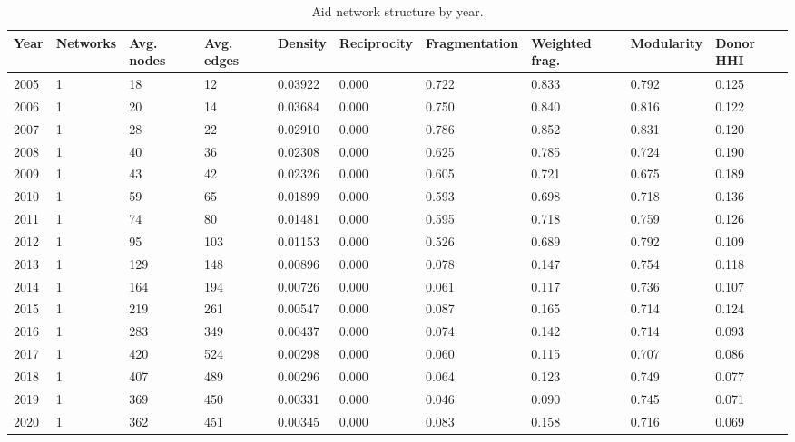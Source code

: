 \begin{table}[!ht]
\centering
\caption{Aid network structure by year.}
\label{tab:aid_network_summary_by_year}
\begin{tabular}{llllllllll}
\toprule
Year & Networks & Avg. nodes & Avg. edges & Density & Reciprocity & Fragmentation & Weighted frag. & Modularity & Donor HHI\\
\midrule
2005 & 1 & 18 & 12 & 0.03922 & 0.000 & 0.722 & 0.833 & 0.792 & 0.125\\
2006 & 1 & 20 & 14 & 0.03684 & 0.000 & 0.750 & 0.840 & 0.816 & 0.122\\
2007 & 1 & 28 & 22 & 0.02910 & 0.000 & 0.786 & 0.852 & 0.831 & 0.120\\
2008 & 1 & 40 & 36 & 0.02308 & 0.000 & 0.625 & 0.785 & 0.724 & 0.190\\
2009 & 1 & 43 & 42 & 0.02326 & 0.000 & 0.605 & 0.721 & 0.675 & 0.189\\
2010 & 1 & 59 & 65 & 0.01899 & 0.000 & 0.593 & 0.698 & 0.718 & 0.136\\
2011 & 1 & 74 & 80 & 0.01481 & 0.000 & 0.595 & 0.718 & 0.759 & 0.126\\
2012 & 1 & 95 & 103 & 0.01153 & 0.000 & 0.526 & 0.689 & 0.792 & 0.109\\
2013 & 1 & 129 & 148 & 0.00896 & 0.000 & 0.078 & 0.147 & 0.754 & 0.118\\
2014 & 1 & 164 & 194 & 0.00726 & 0.000 & 0.061 & 0.117 & 0.736 & 0.107\\
2015 & 1 & 219 & 261 & 0.00547 & 0.000 & 0.087 & 0.165 & 0.714 & 0.124\\
2016 & 1 & 283 & 349 & 0.00437 & 0.000 & 0.074 & 0.142 & 0.714 & 0.093\\
2017 & 1 & 420 & 524 & 0.00298 & 0.000 & 0.060 & 0.115 & 0.707 & 0.086\\
2018 & 1 & 407 & 489 & 0.00296 & 0.000 & 0.064 & 0.123 & 0.749 & 0.077\\
2019 & 1 & 369 & 450 & 0.00331 & 0.000 & 0.046 & 0.090 & 0.745 & 0.071\\
2020 & 1 & 362 & 451 & 0.00345 & 0.000 & 0.083 & 0.158 & 0.716 & 0.069\\
\bottomrule
\end{tabular}
\end{table}
